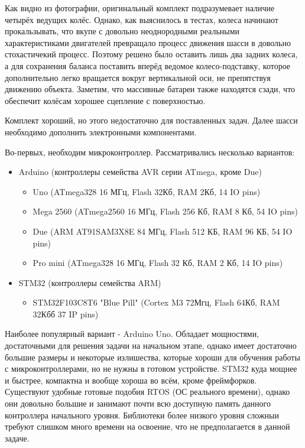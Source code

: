 \documentclass[14pt,a4paper,russian]{scrartcl}
\begin{document}
Как видно из фотографии, оригинальный комплект подразумевает наличие четырёх
ведущих колёс. Однако, как выяснилось в тестах, колеса начинают прокальзывать,
что вкупе с довольно неоднородными реальными характеристиками двигателей
превращало процесс движения шасси в довольно стохастичекий процесс. Поэтому
решено было оставить лишь два задних колеса, а для сохранения баланса
поставить вперёд ведомое колесо-подставку, которое дополнительно
легко вращается вокруг вертикальной оси, не препятствуя движению объекта. Заметим,
что массивные батареи также находятся сзади, что обеспечит колёсам хорошее
сцепление с поверхностью.

Комплект хороший, но этого недостаточно для поставленных задач. Далее шасси
необходимо дополнить электронными компонентами. 

Во-первых, необходим микроконтроллер. Рассматривались несколько вариантов:
\begin{itemize}
    \item Arduino (контроллеры семейства AVR серии ATmega, кроме Due)
    \begin{itemize}
        \item Uno (ATmega328 16 МГц, Flash 32Кб, RAM 2Кб, 14 IO pins)
        \item Mega 2560 (ATmega2560 16 МГц, Flash 256 Кб, RAM 8 Кб, 54 IO pins)
        \item Due (ARM AT91SAM3X8E 84 МГц, Flash 512 КБ, RAM 96 КБ, 54 IO pins)
        \item Pro mini (ATmega328 16 МГц, Flash 32 Кб, RAM 2 Кб, 14 IO pins)
    \end{itemize}
    \item STM32 (контроллеры семейства ARM)
    \begin{itemize}
        \item STM32F103C8T6 "Blue Pill" (Cortex M3 72Мгц, Flash 64Кб, RAM 32Кбб 37 IP pins)
    \end{itemize}
\end{itemize}
Наиболее популярный вариант - Arduino Uno. Обладает мощностями, достаточными
для решения задачи на начальном этапе, однако имеет достаточно большие размеры и
некоторые излишества, которые хороши для обучения работы с микроконтроллерами,
но не нужны в готовом устройстве. STM32 куда мощнее и быстрее, компактна
и вообще хороша во всём, кроме фреймфорков. Существуют удобные готовые подобия
RTOS (ОС реального времени), однако они довольно большие и занимают почти всю
доступную память данного контроллера начального уровня. Библиотеки более низкого
уровня сложныи требуют слишком много времени на освоение, что не предполагается
в данной задаче.
\end{document}
